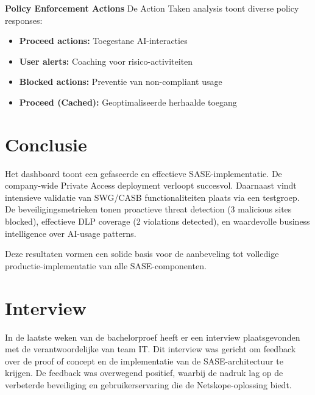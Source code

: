 \textbf{Policy Enforcement Actions}
De Action Taken analysis toont diverse policy responses:
\begin{itemize}
    \item \textbf{Proceed actions:} Toegestane AI-interacties
    \item \textbf{User alerts:} Coaching voor risico-activiteiten
    \item \textbf{Blocked actions:} Preventie van non-compliant usage
    \item \textbf{Proceed (Cached):} Geoptimaliseerde herhaalde toegang
\end{itemize}

\section{Conclusie}
Het dashboard toont een gefaseerde en effectieve SASE-implementatie. De company-wide Private Access deployment verloopt succesvol. Daarnaast vindt intensieve validatie van SWG/CASB functionaliteiten plaats via een testgroep. De beveiligingsmetrieken tonen proactieve threat detection (3 malicious sites blocked), effectieve DLP coverage (2 violations detected), en waardevolle business intelligence over AI-usage patterns.

\vspace{2ex}

Deze resultaten vormen een solide basis voor de aanbeveling tot volledige productie-implementatie van alle SASE-componenten.

\section{Interview}
In de laatste weken van de bachelorproef heeft er een interview plaatsgevonden met de verantwoordelijke van team IT. Dit interview was gericht om feedback over de proof of concept en de implementatie van de SASE-architectuur te krijgen. De feedback was overwegend positief, waarbij de nadruk lag op de verbeterde beveiliging en gebruikerservaring die de Netskope-oplossing biedt. 

